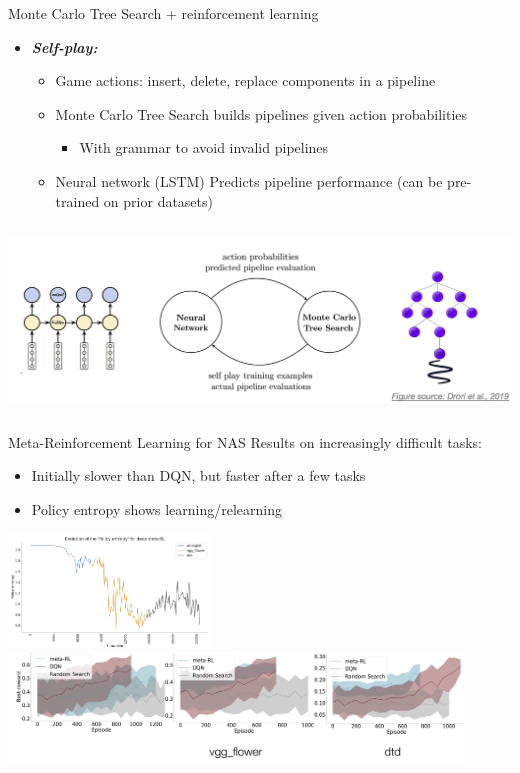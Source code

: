 \documentclass[aspectratio=169,t,handout,xcolor={usenames,dvipsnames}]{beamer}
\begin{document}
\begin{frame}{Monte Carlo Tree Search + reinforcement learning}
    \begin{itemize}
        \item \textbf{\textit{Self-play:}}
        \begin{itemize}
            \item Game actions: insert, delete, replace components in a pipeline
            \item Monte Carlo Tree Search builds pipelines given action probabilities
            \begin{itemize}
                \item With grammar to avoid invalid pipelines
            \end{itemize}
            \item Neural network (LSTM) Predicts pipeline performance (can be pre-trained on prior datasets)
        \end{itemize}
    \end{itemize}
    \centering\includegraphics[height=5cm]{image/Jietu20220328-235128.jpg}
\end{frame}
\begin{frame}{Meta-Reinforcement Learning for NAS}
    Results on increasingly difficult tasks:
    \begin{itemize}
        \item Initially slower than DQN, but faster after a few tasks
        \item Policy entropy shows learning/relearning
    \end{itemize}
    \includegraphics[height=3cm]{image/Picture4.png}
    \includegraphics[height=3cm]{image/Picture5.png}
\end{frame}
\end{document}
